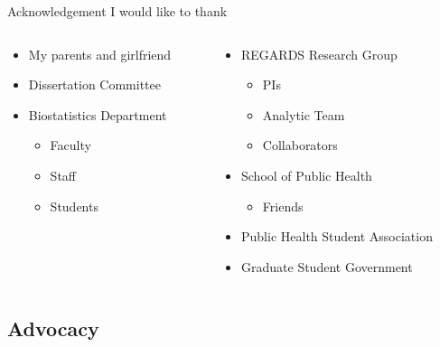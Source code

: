 \documentclass[
  ignorenonframetext,
  aspectratio=169]{beamer}
\providecommand{\tightlist}{%
  \setlength{\itemsep}{0pt}\setlength{\parskip}{0pt}}
\begin{document}
\begin{frame}{Acknowledgement}
\protect\hypertarget{acknowledgement}{}
I would like to thank

\begin{columns}[T]
\begin{column}{0.48\textwidth}
\begin{itemize}
\tightlist
\item
  My parents and girlfriend
\item
  Dissertation Committee
\item
  Biostatistics Department

  \begin{itemize}
  \tightlist
  \item
    Faculty
  \item
    Staff
  \item
    Students
  \end{itemize}
\end{itemize}
\end{column}

\begin{column}{0.48\textwidth}
\begin{itemize}
\tightlist
\item
  REGARDS Research Group

  \begin{itemize}
  \tightlist
  \item
    PIs
  \item
    Analytic Team
  \item
    Collaborators
  \end{itemize}
\item
  School of Public Health

  \begin{itemize}
  \tightlist
  \item
    Friends
  \end{itemize}
\item
  Public Health Student Association
\item
  Graduate Student Government
\end{itemize}
\end{column}
\end{columns}
\end{frame}

\hypertarget{advocacy}{%
\subsection{Advocacy}\label{advocacy}}
\end{document}
